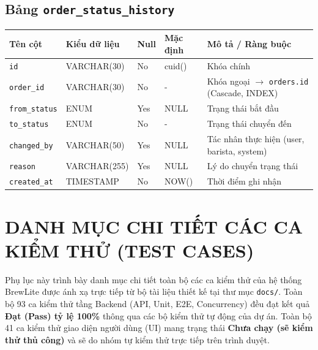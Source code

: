 \documentclass[12pt,a4paper,oneside]{report}
\begin{document}
\section{Bảng \texttt{order\_}\allowbreak\texttt{status\_}\allowbreak\texttt{history}}
\begin{table}[H]
\centering
\small
\begin{tabularx}{\textwidth}{llllX}
\toprule
\textbf{Tên cột} & \textbf{Kiểu dữ liệu} & \textbf{Null} & \textbf{Mặc định} & \textbf{Mô tả / Ràng buộc} \\
\midrule
\texttt{id} & VARCHAR(30) & No & cuid() & Khóa chính \\
\texttt{order\_id} & VARCHAR(30) & No & - & Khóa ngoại \(\to\) \texttt{orders.id} (Cascade, INDEX) \\
\texttt{from\_status} & ENUM & Yes & NULL & Trạng thái bắt đầu \\
\texttt{to\_status} & ENUM & No & - & Trạng thái chuyển đến \\
\texttt{changed\_by} & VARCHAR(50) & Yes & NULL & Tác nhân thực hiện (user, barista, system) \\
\texttt{reason} & VARCHAR(255) & Yes & NULL & Lý do chuyển trạng thái \\
\texttt{created\_at} & TIMESTAMP & No & NOW() & Thời điểm ghi nhận \\
\bottomrule
\end{tabularx}
\end{table}




\clearpage
\chapter{DANH MỤC CHI TIẾT CÁC CA KIỂM THỬ (TEST CASES)}
\label{app:test-cases-full}

Phụ lục này trình bày danh mục chi tiết toàn bộ các ca kiểm thử của hệ thống BrewLite được ánh xạ trực tiếp từ bộ tài liệu thiết kế tại thư mục \texttt{docs/}. Toàn bộ 93 ca kiểm thử tầng Backend (API, Unit, E2E, Concurrency) đều đạt kết quả \textbf{Đạt (Pass) tỷ lệ 100\%} thông qua các bộ kiểm thử tự động của dự án. Toàn bộ 41 ca kiểm thử giao diện người dùng (UI) mang trạng thái \textbf{Chưa chạy (sẽ kiểm thử thủ công)} và sẽ do nhóm tự kiểm thử trực tiếp trên trình duyệt.
\end{document}
